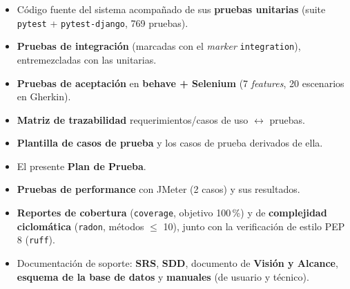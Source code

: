 \documentclass[12pt,letterpaper]{report}
\begin{document}
\begin{itemize}[leftmargin=*]
  \item Código fuente del sistema acompañado de sus \textbf{pruebas unitarias}
  (suite \texttt{pytest} + \texttt{pytest-django}, 769 pruebas).
  \item \textbf{Pruebas de integración} (marcadas con el \emph{marker}
  \texttt{integration}), entremezcladas con las unitarias.
  \item \textbf{Pruebas de aceptación} en \textbf{behave + Selenium}
  (7 \emph{features}, 20 escenarios en Gherkin).
  \item \textbf{Matriz de trazabilidad} requerimientos/casos de uso
  $\leftrightarrow$ pruebas.
  \item \textbf{Plantilla de casos de prueba} y los casos de prueba derivados de
  ella.
  \item El presente \textbf{Plan de Prueba}.
  \item \textbf{Pruebas de performance} con JMeter (2 casos) y sus resultados.
  \item \textbf{Reportes de cobertura} (\texttt{coverage}, objetivo 100\,\%) y de
  \textbf{complejidad ciclomática} (\texttt{radon}, métodos $\leq$ 10), junto con
  la verificación de estilo PEP\,8 (\texttt{ruff}).
  \item Documentación de soporte: \textbf{SRS}, \textbf{SDD}, documento de
  \textbf{Visión y Alcance}, \textbf{esquema de la base de datos} y
  \textbf{manuales} (de usuario y técnico).
\end{itemize}
\end{document}
